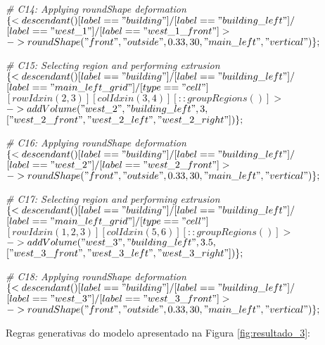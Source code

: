 \noindent \textit{\# C14: Applying roundShape deformation}\\
$\{< descendant() [label=="building"] / [label=="building\_left"] / $\\
$[label=="west\_1"] / [label=="west\_1\_front"] > $\\
$-> roundShape("front", "outside", 0.33, 30, "main\_left", "vertical")\};$

\noindent \textit{\# C15: Selecting region and performing extrusion}\\
$\{< descendant() [label=="building"] / [label=="building\_left"] / $\\
$[label=="main\_left\_grid"] / [type=="cell"] $\\
$[rowIdx in (2, 3)] [colIdx in (3, 4)] [::groupRegions()] > $\\
$-> addVolume("west\_2", "building\_left", 3, $\\
$["west\_2\_front", "west\_2\_left", "west\_2\_right"])\};$

\noindent \textit{\# C16: Applying roundShape deformation}\\
$\{< descendant() [label=="building"] / [label=="building\_left"] / $\\
$[label=="west\_2"] / [label=="west\_2\_front"] > $\\
$-> roundShape("front", "outside", 0.33, 30, "main\_left", "vertical")\};$

\noindent \textit{\# C17: Selecting region and performing extrusion}\\
$\{< descendant() [label=="building"] / [label=="building\_left"] / $\\
$[label=="main\_left\_grid"] / [type=="cell"] $\\
$[rowIdx in (1, 2, 3)] [colIdx in (5, 6)] [::groupRegions()] > $\\
$-> addVolume("west\_3", "building\_left", 3.5, $\\
$["west\_3\_front", "west\_3\_left", "west\_3\_right"])\};$

\noindent \textit{\# C18: Applying roundShape deformation}\\
$\{< descendant() [label=="building"] / [label=="building\_left"] / $\\
$[label=="west\_3"] / [label=="west\_3\_front"] > $\\
$-> roundShape("front", "outside", 0.33, 30, "main\_left", "vertical")\};$

\vspace{1cm}

Regras generativas do modelo apresentado na Figura \ref{fig:resultado_3}:

